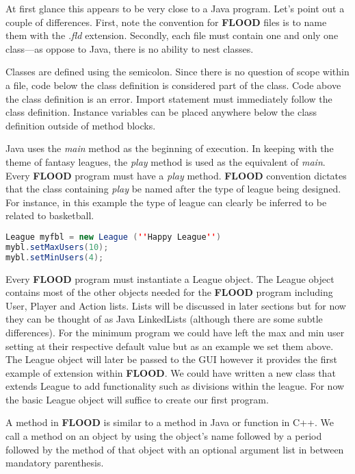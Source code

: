 \documentclass[12pt]{report}
\begin{document}
\begin{doublespace}
At first glance this appears to be very close to a Java program. Let's point out a couple of differences. First, note the convention for \textbf{FLOOD} files is to name them with the \textit{.fld} extension. Secondly, each file must contain one and only one class---as oppose to Java, there is no ability to nest classes.

Classes are defined using the semicolon. Since there is no question of scope within a file, code below the class definition is considered part of the class. Code above the class definition is an error. Import statement must immediately follow the class definition. Instance variables can be placed anywhere below the class definition outside of method blocks.

Java uses the \textit{main} method as the beginning of execution. In keeping with the theme of fantasy leagues, the \textit{play} method is used as the equivalent of \textit{main}. Every \textbf{FLOOD} program must have a \textit{play} method. \textbf{FLOOD} convention dictates that the class containing \textit{play} be named after the type of league being designed. For instance, in this example the type of league can clearly be inferred to be related to basketball.
\end{doublespace}

\begin{lstlisting}[language=Java,label=some-code,caption=A basketball league]
League myfbl = new League (''Happy League'')
mybl.setMaxUsers(10);
mybl.setMinUsers(4);
\end{lstlisting}

\begin{doublespace}
Every \textbf{FLOOD} program must instantiate a League object. The League object contains most of the other objects needed for the \textbf{FLOOD} program including User, Player and Action lists. Lists will be discussed in later sections but for now they can be thought of as Java LinkedLists (although there are some subtle differences). For the minimum program we could have left the max and min user setting at their respective default value but as an example we set them above. The League object will later be passed to the GUI however it provides the first example of extension within \textbf{FLOOD}. We could have written a new class that extends League to add functionality such as divisions within the league. For now the basic League object will suffice to create our first program.

A method in \textbf{FLOOD} is similar to a method in Java or function in C++. We call a method on an object by using the object's name followed by a period followed by the method of that object with an optional argument list in between mandatory parenthesis.
\end{doublespace}
\end{document}
